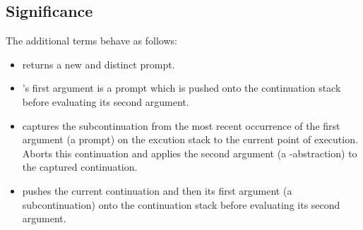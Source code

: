   \subsection{Significance}

  The additional terms behave as follows:
  \begin{itemize}
  \item {} returns a new and distinct prompt.
  \item {}'s first argument is a prompt which is pushed onto the continuation stack before evaluating its second argument. 
  \item {} captures the subcontinuation from the most recent occurrence of the first argument (a prompt) on the excution stack to the current point of execution. Aborts this continuation and applies the second argument (a \lam-abstraction) to the captured continuation.
  \item {} pushes the current continuation and then its first argument (a subcontinuation) onto the continuation stack before evaluating its second argument.
  \end{itemize}
